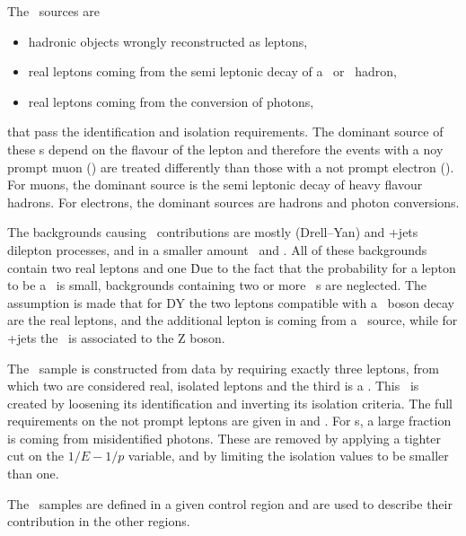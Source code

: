 The \NPL\ sources are 
\begin{itemize}
	\item hadronic objects wrongly reconstructed as leptons, 
	\item real leptons coming from the semi leptonic decay of a \Pbottom\ or \Pcharm\ hadron,
	\item real leptons coming from the conversion of photons, 
\end{itemize}
that pass the identification and isolation requirements. The dominant source of these \NPL s depend on the flavour of the lepton and therefore the events with a noy prompt muon (\NPM) are treated differently than those with a not prompt electron (\NPE). For muons, the dominant source is the semi leptonic decay of heavy flavour hadrons. For electrons, the dominant sources are hadrons and photon conversions. 

The backgrounds causing \NPL\ contributions are mostly \DY (Drell--Yan) and \ttbar+jets dilepton processes, and in a smaller amount \WW\ and \tWZ. All of these backgrounds contain two real leptons and one \NPL\. Due to the fact that the probability for a lepton to be a \NPL\ is small, backgrounds containing two or more \NPL\ s are neglected. The assumption is made that for DY the two leptons compatible with a \PZ\ boson decay are the real leptons, and the additional lepton is coming from a \NPL\ source, while for \ttbar+jets the \NPL\ is associated to the Z boson. 

The \NPL\ sample is constructed from data by requiring exactly three leptons, from which two are considered real, isolated leptons and the third is a \NPL. This \NPL\ is created by loosening its identification and inverting its isolation criteria. The full requirements on the not prompt leptons are given in   and .  For \NPE s, a large fraction is coming from misidentified photons. These are removed by applying a tighter cut on the $1/E-1/p$ variable, and by limiting the isolation values to be smaller than one. 

The \NPL\  samples are defined in a given control region and are used to describe their contribution in the other regions. 

